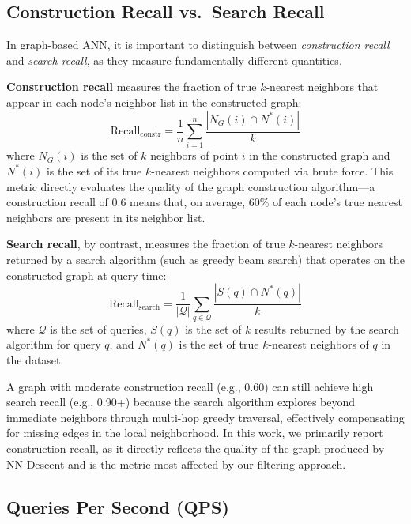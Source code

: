 \subsection{Construction Recall vs.\ Search Recall}
\label{sec:construction_recall}

In graph-based ANN, it is important to distinguish between \emph{construction recall} and \emph{search recall}, as they measure fundamentally different quantities.

\textbf{Construction recall} measures the fraction of true $k$-nearest neighbors that appear in each node's neighbor list in the constructed graph:
\begin{equation}
    \text{Recall}_{\text{constr}} = \frac{1}{n} \sum_{i=1}^{n} \frac{|N_G(i) \cap N^*(i)|}{k}
    \label{eq:construction_recall}
\end{equation}
where $N_G(i)$ is the set of $k$ neighbors of point $i$ in the constructed graph and $N^*(i)$ is the set of its true $k$-nearest neighbors computed via brute force.
This metric directly evaluates the quality of the graph construction algorithm---a construction recall of 0.6 means that, on average, 60\% of each node's true nearest neighbors are present in its neighbor list.

\textbf{Search recall}, by contrast, measures the fraction of true $k$-nearest neighbors returned by a search algorithm (such as greedy beam search) that operates on the constructed graph at query time:
\begin{equation}
    \text{Recall}_{\text{search}} = \frac{1}{|\mathcal{Q}|} \sum_{q \in \mathcal{Q}} \frac{|S(q) \cap N^*(q)|}{k}
    \label{eq:search_recall}
\end{equation}
where $\mathcal{Q}$ is the set of queries, $S(q)$ is the set of $k$ results returned by the search algorithm for query $q$, and $N^*(q)$ is the set of true $k$-nearest neighbors of $q$ in the dataset.

A graph with moderate construction recall (e.g., 0.60) can still achieve high search recall (e.g., 0.90+) because the search algorithm explores beyond immediate neighbors through multi-hop greedy traversal, effectively compensating for missing edges in the local neighborhood.
In this work, we primarily report construction recall, as it directly reflects the quality of the graph produced by NN-Descent and is the metric most affected by our filtering approach.

\subsection{Queries Per Second (QPS)}
\label{sec:qps}

